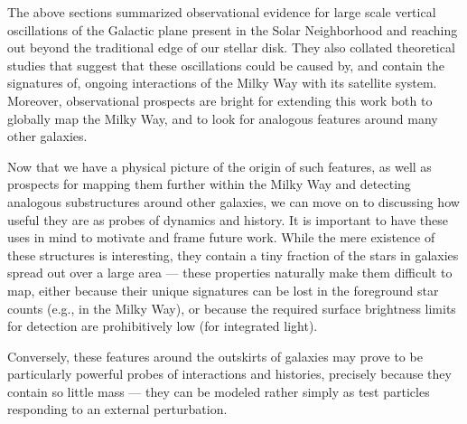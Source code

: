 \documentclass[galaxies,article,submit,moreauthors,pdftex,10pt,a4paper]{mdpi}
\begin{document}

\label{sec:conc}

The above sections  summarized observational evidence for large scale vertical oscillations of the Galactic plane present in the Solar Neighborhood and reaching out beyond the traditional edge of our stellar disk.
They also collated theoretical studies that suggest that these oscillations could be caused by, and contain the signatures of, ongoing interactions of the Milky Way with its satellite system.
Moreover, observational prospects are bright for extending this work both to globally map the Milky Way, and to look for analogous features around many other galaxies.

Now that we have a physical picture of the origin of such features, as well as prospects for mapping them further within the Milky Way and detecting analogous substructures around other galaxies, we can move on to discussing how useful they are as probes of dynamics and history.
It is important to have these uses in mind to motivate and frame  future work.
While the mere existence of these structures is interesting, they contain a tiny fraction of the stars in galaxies spread out over a large area --- these properties naturally make them difficult to map, either because their unique signatures can be lost in the foreground star counts (e.g., in the Milky Way), or  because the required surface brightness limits for detection are prohibitively low (for integrated light).

Conversely, these features around the outskirts of galaxies may prove to be particularly powerful probes of interactions and histories, precisely because they contain so little mass --- they can be modeled rather simply as test particles responding to an external perturbation.
\end{document}
